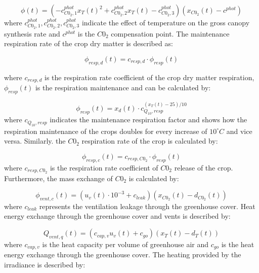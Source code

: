\begin{equation}
	\phi (t) = ( -c_{C0_2,1}^{phot} x_T(t)^2 +  c_{C0_2,2}^{phot} x_T(t) - c_{C0_2,3}^{phot} )( x_{C0_2}(t) - c^{phot})
	\label{eq: model phi}
\end{equation}
where $c_{C0_2,1}^{phot},c_{C0_2,2}^{phot},c_{C0_2,3}^{phot}$ indicate the effect of temperature on the gross canopy synthesis rate and $c^{phot}$ is the $C0_2$ compensation point. The maintenance respiration rate of the crop dry matter is described as:

\begin{equation}
	\phi_{resp,d}(t) = c_{resp,d} \cdot \phi_{resp}(t)
	\label{eq:maintenance respiration rate}
\end{equation}

where $c_{resp,d}$ is the respiration rate coefficient of the crop dry matter respiration, $\phi_{resp}(t)$ is the respiration maintenance and can be calculated by:

\begin{equation}
	\phi_{resp}(t) = x_d(t) \cdot c_{Q_{10},resp}^{(x_T(t)-25)/10}
	\label{ respiration maintenance}
\end{equation}
where $ c_{Q_{10},resp}$ indicates the maintenance respiration factor and shows how the respiration maintenance of the crops doubles for every increase of $10^{\circ}C$ and vice versa.
Similarly. the $C0_2$ respiration rate of the crop is calculated by:

\begin{equation}
	\phi_{resp,c}(t) = c_{resp,C0_2} \cdot \phi_{resp}(t)
	\label{ co2 respiration rate}
\end{equation}
where $c_{resp,C0_2}$ is the respiration rate coefficient of $C0_2$ release of the crop. Furthermore, the mass exchange of $C0_2$ is calculated by:

\begin{equation}
	\phi_{vent,c}(t) = (u_v(t) \cdot 10^{-3} + c_{leak})(x_{C0_2}(t) - d_{C0_2}(t))
	\label{eq:co2 exchange}
\end{equation}
where $c_{leak}$ represents the ventilation leakage through the greenhouse cover. Heat energy exchange through the greenhouse cover and vents is described by:

\begin{equation}
	Q_{vent,q}(t) = (c_{cap,v}u_v(t) + c_{go})(x_T(t) - d_T(t))
	\label{heat exchange}
\end{equation}
where $c_{cap,v}$ is the heat capacity per volume of greenhouse air and $c_{go}$ is the heat energy exchange through the greenhouse cover. The heating provided by the irradiance is described by:

